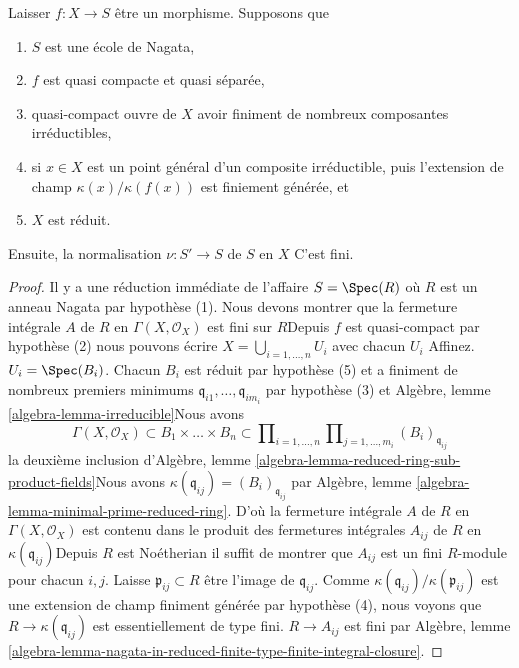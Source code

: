 \begin{lemma}

\label{lemma-nagata-normalization-finite-general}

Laisser $f : X \to S$ être un morphisme. Supposons que

\begin{enumerate}

\item  $S$ est une école de Nagata,
\item  $f$ est quasi compacte et quasi séparée,
\item quasi-compact ouvre de $X$ avoir finiment de nombreux composantes irréductibles,
\item si $x \in X$ est un point général d'un composite irréductible, puis l'extension de champ $\kappa(x)/\kappa(f(x))$ est finiement générée, et
\item  $X$ est réduit.

\end{enumerate}

Ensuite, la normalisation $\nu : S' \to S$ de $S$ en $X$ C'est fini.

\end{lemma}

\begin{proof}

Il y a une réduction immédiate de l'affaire $S = \Spec(R)$
où $R$ est un anneau Nagata par hypothèse (1). Nous devons montrer que la fermeture intégrale $A$ de $R$ en $\Gamma(X, \mathcal{O}_X)$ est fini sur $R$Depuis $f$ est quasi-compact par hypothèse (2) nous pouvons écrire
$X = \bigcup_{i = 1, \ldots, n} U_i$ avec chacun $U_i$ Affinez. $U_i = \Spec(B_i)$. Chacun $B_i$ est réduit par hypothèse (5) et a finiment de nombreux premiers minimums
$\mathfrak q_{i1}, \ldots, \mathfrak q_{im_i}$
par hypothèse (3) et Algèbre, lemme \ref{algebra-lemma-irreducible}Nous avons
$$
\Gamma(X, \mathcal{O}_X) \subset B_1 \times \ldots \times B_n
\subset
\prod\nolimits_{i = 1, \ldots, n}
\prod\nolimits_{j = 1, \ldots, m_i} (B_i)_{\mathfrak q_{ij}}
$$
la deuxième inclusion d'Algèbre, lemme \ref{algebra-lemma-reduced-ring-sub-product-fields}Nous avons $\kappa(\mathfrak q_{ij}) = (B_i)_{\mathfrak q_{ij}}$ par Algèbre, lemme \ref{algebra-lemma-minimal-prime-reduced-ring}. D'où la fermeture intégrale $A$ de $R$ en $\Gamma(X, \mathcal{O}_X)$
est contenu dans le produit des fermetures intégrales $A_{ij}$ de
$R$ en $\kappa(\mathfrak q_{ij})$Depuis $R$ est Noétherian il suffit de montrer que $A_{ij}$ est un fini $R$-module pour chacun $i, j$. Laisse $\mathfrak p_{ij} \subset R$ être l'image de $\mathfrak q_{ij}$. Comme $\kappa(\mathfrak q_{ij})/\kappa(\mathfrak p_{ij})$
est une extension de champ finiment générée par hypothèse (4), nous voyons que $R \to \kappa(\mathfrak q_{ij})$ est essentiellement de type fini. $R \to A_{ij}$ est fini par Algèbre, lemme
\ref{algebra-lemma-nagata-in-reduced-finite-type-finite-integral-closure}.

\end{proof}

